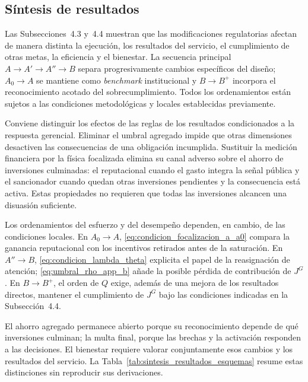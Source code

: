 \subsection{Síntesis de resultados}

Las Subsecciones~4.3 y~4.4 muestran que las modificaciones regulatorias afectan de manera distinta la ejecución, los resultados del servicio, el cumplimiento de otras metas, la eficiencia y el bienestar. La secuencia principal \(A\to A'\to A''\to B\) separa progresivamente cambios específicos del diseño; \(A_0\to A\) se mantiene como \textit{benchmark} institucional y \(B\to B^{+}\) incorpora el reconocimiento acotado del sobrecumplimiento. Todos los ordenamientos están sujetos a las condiciones metodológicas y locales establecidas previamente.

Conviene distinguir los efectos de las reglas de los resultados condicionados a la respuesta gerencial. Eliminar el umbral agregado impide que otras dimensiones desactiven las consecuencias de una obligación incumplida. Sustituir la medición financiera por la física focalizada elimina su canal adverso sobre el ahorro de inversiones culminadas: el reputacional cuando el gasto integra la señal pública y el sancionador cuando quedan otras inversiones pendientes y la consecuencia está activa. Estas propiedades no requieren que todas las inversiones alcancen una disuasión suficiente.

Los ordenamientos del esfuerzo y del desempeño dependen, en cambio, de las condiciones locales. En \(A_0\to A\), \eqref{eq:condicion_focalizacion_a_a0} compara la ganancia reputacional con los incentivos retirados antes de la saturación. En \(A''\to B\), \eqref{eq:condicion_lambda_theta} explicita el papel de la reasignación de atención; \eqref{eq:umbral_rho_app_b} añade la posible pérdida de contribución de \(J^G\). En \(B\to B^+\), el orden de \(Q\) exige, además de una mejora de los resultados directos, mantener el cumplimiento de \(J^G\) bajo las condiciones indicadas en la Subsección~4.4.

El ahorro agregado permanece abierto porque su reconocimiento depende de qué inversiones culminan; la multa final, porque las brechas y la activación responden a las decisiones. El bienestar requiere valorar conjuntamente esos cambios y los resultados del servicio. La Tabla~\ref{tab:sintesis_resultados_esquemas} resume estas distinciones sin reproducir sus derivaciones.

